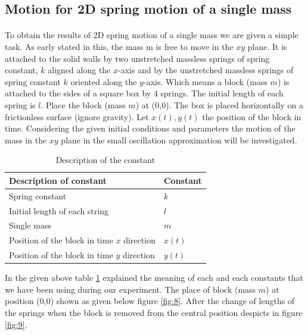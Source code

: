\subsection{Motion for 2D spring motion of a single mass}

\paragraph{}

To obtain the results of 2D spring motion of a single mass we are given a simple task. As early stated in this, the mass m is free to move in the $xy$ plane. It is attached to the solid walls by two unstretched massless springs of spring constant, $k$ aligned along the $x$-axis and by the unstretched massless springs of spring constant $k$ oriented along the $y$-axis. Which means a block (mass $m$) is attached to the sides of a square box by 4 springs. The initial length of each spring is $l$. Place the block (mass $m$) at (0,0). The box is placed horizontally on a frictionless surface (ignore gravity). Let $x(t),y(t)$ the position of the block in time. Considering the given initial conditions and parameters the motion of the mass in the $xy$ plane in the small oscillation approximation will be investigated.

 
\begin{table}[hbt!]
\begin{center}
    \begin{tabular}{|p{8cm}|p{2cm}|}
    \hline
    \textbf{Description of constant} & \textbf{Constant} 
    \\
    \hline
      Spring constant   & $k$ \\
      \hline
     Initial length of each string & $l$ \\
     \hline
     Single mass & $m$ \\
     \hline
     Position of the block in time $x$ direction & $x(t)$ \\
     \hline
     Position of the block in time $y$ direction & $y(t)$ \\
     \hline
    \end{tabular}
    \caption{Description of the constant}
    \label{tab1}
    \end{center}
\end{table}

In the given above table \ref{tab1} explained the meaning of each and each constants that we have been using during our experiment. The place of block (mass $m$) at position (0,0) shown as given below figure \ref{fig:8}. After the change of lengths of the springs when the block is removed from the central position despicts in figure \ref{fig:9}. 

